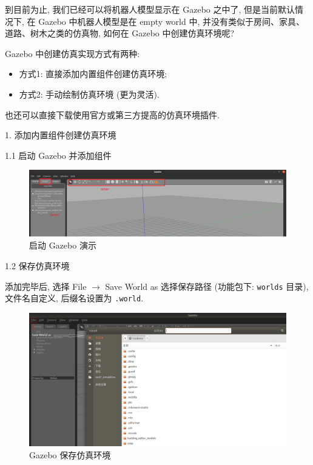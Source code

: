 \documentclass[openany, fontset=windowsold]{ctexbook}
\theoremstyle{kaiti}
\theoremstyle{normal}
\begin{document}
到目前为止, 我们已经可以将机器人模型显示在 Gazebo 之中了, 但是当前默认情况下, 在 Gazebo 中机器人模型是在 empty world 中, 并没有类似于房间、家具、道路、树木之类的仿真物, 如何在 Gazebo 中创建仿真环境呢? 

Gazebo 中创建仿真实现方式有两种:

\begin{itemize}
  \item 方式1: 直接添加内置组件创建仿真环境;
  \item 方式2: 手动绘制仿真环境 (更为灵活).
\end{itemize}

也还可以直接下载使用官方或第三方提高的仿真环境插件.

1. 添加内置组件创建仿真环境

1.1 启动 Gazebo 并添加组件

\begin{figure}[!ht]
  \centering
  \includegraphics[width=.9\textwidth]{gazebo_start.png}
  \caption{启动 Gazebo 演示}
  \label{fig:gazebo_start}
\end{figure}

1.2 保存仿真环境

添加完毕后, 选择 File $\rightarrow$ Save World as 选择保存路径 (功能包下: \verb|worlds| 目录), 文件名自定义, 后缀名设置为 \verb|.world|.

\begin{figure}[!ht]
  \centering
  \includegraphics[width=.9\textwidth]{gazebo_save_world.png}
  \caption{Gazebo 保存仿真环境}
  \label{fig:gazebo_save_world}
\end{figure}
\end{document}
